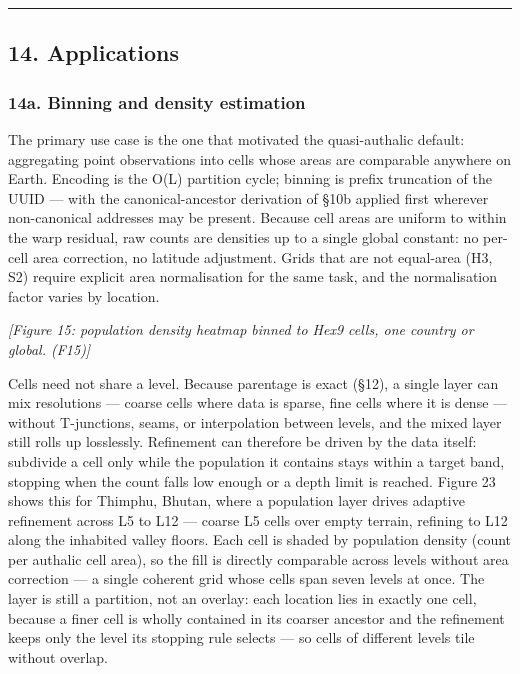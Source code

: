 \documentclass[
  11pt,
  a4paper,
]{article}
\begin{document}
\begin{center}\rule{0.5\linewidth}{0.5pt}\end{center}

\subsection{14. Applications}\label{applications}

\subsubsection{14a. Binning and density
estimation}\label{a.-binning-and-density-estimation}

The primary use case is the one that motivated the quasi-authalic
default: aggregating point observations into cells whose areas are
comparable anywhere on Earth. Encoding is the O(L) partition cycle;
binning is prefix truncation of the UUID --- with the canonical-ancestor
derivation of §10b applied first wherever non-canonical addresses may be
present. Because cell areas are uniform to within the warp residual, raw
counts are densities up to a single global constant: no per-cell area
correction, no latitude adjustment. Grids that are not equal-area (H3,
S2) require explicit area normalisation for the same task, and the
normalisation factor varies by location.

\emph{{[}Figure 15: population density heatmap binned to Hex9 cells, one
country or global. (F15){]}}

Cells need not share a level. Because parentage is exact (§12), a single
layer can mix resolutions --- coarse cells where data is sparse, fine
cells where it is dense --- without T-junctions, seams, or interpolation
between levels, and the mixed layer still rolls up losslessly.
Refinement can therefore be driven by the data itself: subdivide a cell
only while the population it contains stays within a target band,
stopping when the count falls low enough or a depth limit is reached.
Figure 23 shows this for Thimphu, Bhutan, where a population layer
drives adaptive refinement across L5 to L12 --- coarse L5 cells over
empty terrain, refining to L12 along the inhabited valley floors. Each
cell is shaded by population density (count per authalic cell area), so
the fill is directly comparable across levels without area correction
--- a single coherent grid whose cells span seven levels at once. The
layer is still a partition, not an overlay: each location lies in
exactly one cell, because a finer cell is wholly contained in its
coarser ancestor and the refinement keeps only the level its stopping
rule selects --- so cells of different levels tile without overlap.
\end{document}
